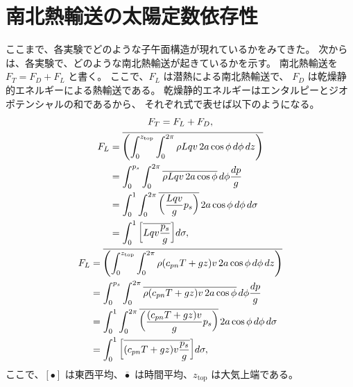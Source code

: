 \documentclass[body]{subfiles}
\begin{document}
\afterpage{\clearpage}

\section{南北熱輸送の太陽定数依存性}

ここまで、各実験でどのような子午面構造が現れているかをみてきた。
次からは、各実験で、どのような南北熱輸送が起きているかを示す。
南北熱輸送を \(F_T=F_D+F_L\) と書く。
ここで、\(F_L\) は潜熱による南北熱輸送で、
\(F_D\) は乾燥静的エネルギーによる熱輸送である。
乾燥静的エネルギーはエンタルピーとジオポテンシャルの和であるから、
それぞれ式で表せば以下のようになる。
\begin{gather}
	F_T=F_L+F_D,\\
	\begin{split}
		F_L&=\overline{\qty(\int^{z_\text{top}}_0\int^{2\pi}_0 \rho Lqv\,2a\cos\phi\,d\phi\,dz)}\\
		&=\int^{p_s}_0\int^{2\pi}_0 \overline{\rho Lqv\,2a\cos\phi}\,d\phi\frac{dp}{g}\\
		&=\int^1_0\int^{2\pi}_0 \overline{\qty(\frac{Lqv}{g}p_s)}\,2a\cos\phi\,d\phi\,d\sigma\\
		&=\int^1_0 \qty[\overline{Lqv\frac{p_s}{g}}]d\sigma,
	\end{split}\\
	\begin{split}
		F_L&=\overline{\qty(\int^{z_\text{top}}_0\int^{2\pi}_0 \rho (c_{pn}T+gz)v\,2a\cos\phi\,d\phi\,dz)}\\
		&=\int^{p_s}_0\int^{2\pi}_0 \overline{\rho (c_{pn}T+gz)v\,2a\cos\phi}\,d\phi\frac{dp}{g}\\
		&=\int^1_0\int^{2\pi}_0 \overline{\qty(\frac{(c_{pn}T+gz)v}{g}p_s)}\,2a\cos\phi\,d\phi\,d\sigma\\
		&=\int^1_0 \qty[\overline{(c_{pn}T+gz)v\frac{p_s}{g}}]d\sigma,
	\end{split}
\end{gather}
ここで、\([\bullet]\) は東西平均、\(\bar\bullet\) は時間平均、\(z_\text{top}\) は大気上端である。
\end{document}
